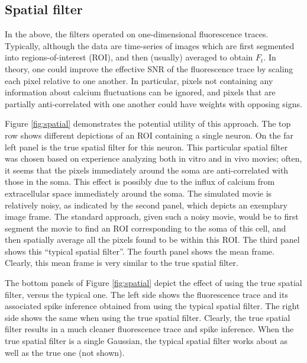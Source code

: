 \subsection{Spatial filter} \label{sec:results:spatial}

In the above, the filters operated on one-dimensional fluorescence traces. Typically, although the data are time-series of images which are first segmented into regions-of-interest (ROI), and then (usually) averaged to obtain $F_t$.  In theory, one could improve the effective SNR of the fluorescence trace by scaling each pixel relative to one another.  In particular, pixels not containing any information about calcium fluctuations can be ignored, and pixels that are partially anti-correlated with one another could have weights with opposing signs.  

Figure \ref{fig:spatial} demonstrates the potential utility of this approach.  The top row shows different depictions of an ROI containing a single neuron.  On the far left panel is the true spatial filter for this neuron.  This particular spatial filter was chosen based on experience analyzing both in vitro and in vivo movies; often, it seems that the pixels immediately around the soma are anti-correlated with those in the soma.  This effect is possibly due to the influx of calcium from extracellular space immediately around the soma.  The simulated movie is relatively noisy, as indicated by the second panel, which depicts an exemplary image frame.  The standard approach, given such a noisy movie, would be to first segment the movie to find an ROI corresponding to the soma of this cell, and then spatially average all the pixels found to be within this ROI.  The third panel shows this ``typical spatial filter''.  The fourth panel shows the mean frame.  Clearly, this mean frame is very similar to the true spatial filter.  

The bottom panels of Figure \ref{fig:spatial} depict the effect of using the true spatial filter, versus the typical one. The left side shows the fluorescence trace and its associated spike inference obtained from using the typical spatial filter.  The right side shows the same when using the true spatial filter.  Clearly, the true spatial filter results in a much cleaner fluorescence trace and spike inference.  When the true spatial filter is a single Gaussian, the typical spatial filter works about as well as the true one (not shown).


